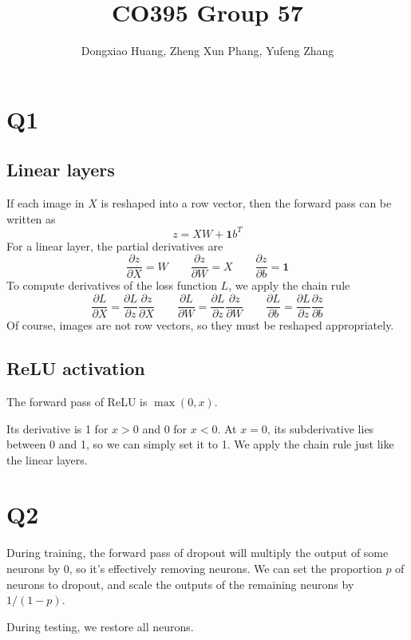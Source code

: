 \documentclass[12pt, a4paper]{article}
\title{\vspace{-6ex} CO395 Group 57 \vspace{-1ex}}
\author{Dongxiao Huang, Zheng Xun Phang, Yufeng Zhang}
\date{\vspace{-3ex}}
\begin{document}
\maketitle
\newcommand\ones{\bm{1}}

\section*{Q1}
\subsection*{Linear layers}
If each image in $X$ is reshaped into a row vector, then the forward pass can be written as
\[ z = XW + \ones b^T \]
For a linear layer, the partial derivatives are
\[ \frac{\partial z}{\partial X} = W \qquad \frac{\partial z}{\partial W} = X \qquad \frac{\partial z}{\partial b} = \ones \]
To compute derivatives of the loss function $L$, we apply the chain rule
\[ \frac{\partial L}{\partial X} = \frac{\partial L}{\partial z} \frac{\partial z}{\partial X} \qquad \frac{\partial L}{\partial W} = \frac{\partial L}{\partial z} \frac{\partial z}{\partial W} \qquad \frac{\partial L}{\partial b} = \frac{\partial L}{\partial z} \frac{\partial z}{\partial b} \]
Of course, images are not row vectors, so they must be reshaped appropriately.

\subsection*{ReLU activation}
The forward pass of ReLU is $\max(0, x)$.\par
\bigskip
Its derivative is 1 for $x > 0$ and 0 for $x < 0$. At $x = 0$, its subderivative lies between 0 and 1, so we can simply set it to 1. We apply the chain rule just like the linear layers.

\section*{Q2}
During training, the forward pass of dropout will multiply the output of some neurons by 0, so it's effectively removing neurons. We can set the proportion $p$ of neurons to dropout, and scale the outputs of the remaining neurons by $1/(1-p)$.\par
\bigskip
During testing, we restore all neurons.
\end{document}
